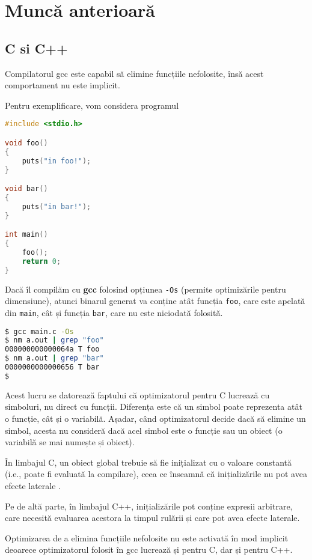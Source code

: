 \section{Muncă anterioară}

\subsection{C si C++}

Compilatorul gcc este capabil să elimine funcțiile nefolosite,
însă acest comportament nu este implicit.

Pentru exemplificare, vom considera programul
\begin{lstlisting}[language=C, title=main.c, label=c_program]
#include <stdio.h>

void foo()
{
    puts("in foo!");
}

void bar()
{
    puts("in bar!");
}

int main()
{
    foo();
    return 0;
}
\end{lstlisting}

Dacă îl compilăm cu \textbf{gcc} folosind opțiunea \texttt{-Os}
(permite optimizările pentru dimensiune), atunci binarul generat
va conține atât funcția \texttt{foo}, care este apelată din
\texttt{main}, cât și funcția \texttt{bar}, care nu este
niciodată folosită.

\begin{lstlisting}[language=Bash]
$ gcc main.c -Os
$ nm a.out | grep "foo"
000000000000064a T foo
$ nm a.out | grep "bar"
0000000000000656 T bar
$
\end{lstlisting}

Acest lucru se datorează faptului că optimizatorul pentru C
lucrează cu simboluri, nu direct cu funcții.  Diferența este că
un simbol poate reprezenta atât o funcție, cât și o variabilă.
Așadar, când optimizatorul decide dacă să elimine un simbol,
acesta nu consideră dacă acel simbol este o funcție sau un obiect
(o variabilă se mai numește și obiect).

În limbajul C, un obiect global trebuie să fie inițializat cu o
valoare constantă (i.e., poate fi evaluată la compilare), ceea ce
înseamnă că inițializările nu pot avea efecte laterale
\cite{c_static_init}.

Pe de altă parte, în limbajul C++, inițializările pot conține
expresii arbitrare, care necesită evaluarea acestora la timpul
rulării \cite{cpp_static_init} și care pot avea efecte laterale.

Optimizarea de a elimina funcțiile nefolosite nu este activată în
mod implicit deoarece optimizatorul folosit în gcc lucrează și
pentru C, dar și pentru C++.

